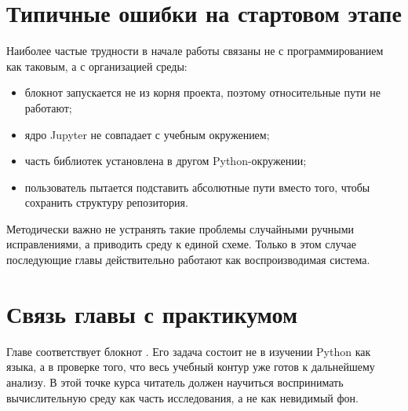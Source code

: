 \section{Типичные ошибки на стартовом этапе}

Наиболее частые трудности в начале работы связаны не с программированием как таковым, а с организацией среды:
\begin{itemize}[leftmargin=1.25cm]
\item блокнот запускается не из корня проекта, поэтому относительные пути не работают;
\item ядро Jupyter не совпадает с учебным окружением;
\item часть библиотек установлена в другом Python-окружении;
\item пользователь пытается подставить абсолютные пути вместо того, чтобы сохранить структуру репозитория.
\end{itemize}

Методически важно не устранять такие проблемы случайными ручными исправлениями, а приводить среду к единой схеме. Только в этом случае последующие главы действительно работают как воспроизводимая система.

\section{Связь главы с практикумом}

Главе соответствует блокнот . Его задача состоит не в изучении Python как языка, а в проверке того, что весь учебный контур уже готов к дальнейшему анализу. В этой точке курса читатель должен научиться воспринимать вычислительную среду как часть исследования, а не как невидимый фон.
